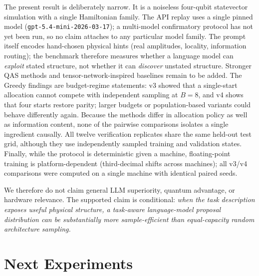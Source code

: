 \documentclass[11pt]{article}
\begin{document}
The present result is deliberately narrow.
It is a noiseless four-qubit statevector simulation with a single Hamiltonian family.
The API replay uses a single pinned model (\texttt{gpt-5.4-mini-2026-03-17}); a multi-model confirmatory protocol has not yet been run, so no claim attaches to any particular model family.
The prompt itself encodes hand-chosen physical hints (real amplitudes, locality, information routing); the benchmark therefore measures whether a language model can \emph{exploit} stated structure, not whether it can \emph{discover} unstated structure.
Stronger QAS methods and tensor-network-inspired baselines remain to be added.
The Greedy findings are budget-regime statements: v3 showed that a single-start allocation cannot compete with independent sampling at $B=8$, and v4 shows that four starts restore parity; larger budgets or population-based variants could behave differently again.
Because the methods differ in allocation policy as well as information content, none of the pairwise comparisons isolates a single ingredient causally.
All twelve verification replicates share the same held-out test grid, although they use independently sampled training and validation states.
Finally, while the protocol is deterministic given a machine, floating-point training is platform-dependent (third-decimal shifts across machines); all v3/v4 comparisons were computed on a single machine with identical paired seeds.

We therefore do not claim general LLM superiority, quantum advantage, or hardware relevance.
The supported claim is conditional:
\emph{when the task description exposes useful physical structure, a task-aware language-model proposal distribution can be substantially more sample-efficient than equal-capacity random architecture sampling.}

\section{Next Experiments}
\label{sec:next}
\end{document}
